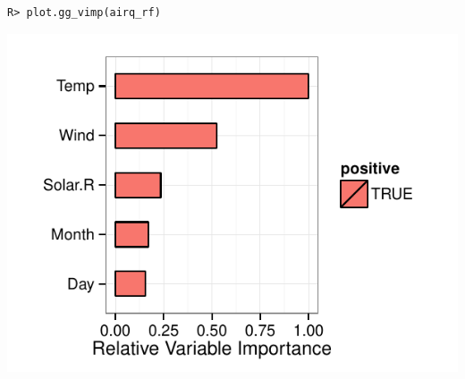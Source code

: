 \documentclass[nojss]{jss}\usepackage[]{graphicx}\usepackage[]{color}
\makeatletter
\def\maxwidth{ %
  \ifdim\Gin@nat@width>\linewidth
    \linewidth
  \else
    \Gin@nat@width
  \fi
}
\newenvironment{kframe}{%
 \def\at@end@of@kframe{}%
 \ifinner\ifhmode%
  \def\at@end@of@kframe{\end{minipage}}%
  \begin{minipage}{\columnwidth}%
 \fi\fi%
 \def\FrameCommand##1{\hskip\@totalleftmargin \hskip-\fboxsep
 \colorbox{shadecolor}{##1}\hskip-\fboxsep
     \hskip-\linewidth \hskip-\@totalleftmargin \hskip\columnwidth}%
 \MakeFramed {\advance\hsize-\width
   \@totalleftmargin\z@ \linewidth\hsize
   \@setminipage}}%
 {\par\unskip\endMakeFramed%
 \at@end@of@kframe}
\newenvironment{knitrout}{}{} %
\makeatother
\begin{document}
\begin{knitrout}\footnotesize
{}\color{fgcolor}\begin{kframe}
\begin{verbatim}
R> plot.gg_vimp(airq_rf)
\end{verbatim}
\end{kframe}

{\centering \includegraphics[width=\maxwidth]{figure/beamer-airq-vimp-1} 

}



\end{knitrout}
\end{document}

